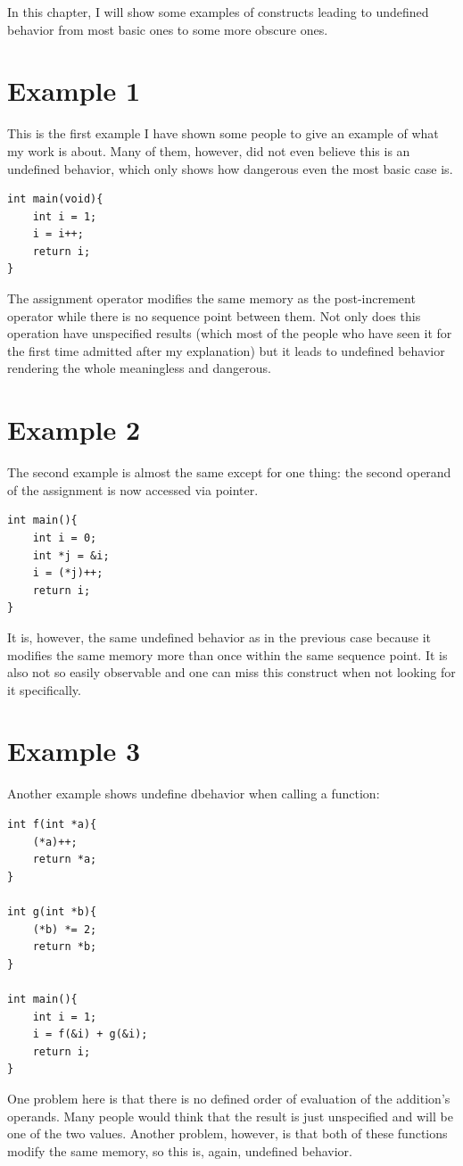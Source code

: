 In this chapter, I will show some examples of constructs leading to undefined behavior from most basic ones to some more obscure ones.

\section{Example 1}\label{example1}
This is the first example I have shown some people to give an example of what my work is about. Many of them, however, did not even believe this is an undefined behavior, which only shows how dangerous even the most basic case is.
\begin{lstlisting}
int main(void){
	int i = 1;
	i = i++;
	return i;
}
\end{lstlisting}
The assignment operator modifies the same memory as the post-increment operator while there is no sequence point between them. Not only does this operation have unspecified results (which most of the people who have seen it for the first time admitted after my explanation) but it leads to undefined behavior rendering the whole meaningless and dangerous.

\section{Example 2}\label{example2}
The second example is almost the same except for one thing: the second operand of the assignment is now accessed via pointer.
\begin{lstlisting}
int main(){
	int i = 0;
	int *j = &i;
	i = (*j)++;
    return i;
}
\end{lstlisting}\label{example2}
It is, however, the same undefined behavior as in the previous case because it modifies the same memory more than once within the same sequence point. It is also not so easily observable and one can miss this construct when not looking for it specifically.

\section{Example 3}\label{example3}
Another example shows undefine dbehavior when calling a function:
\begin{lstlisting}
int f(int *a){
    (*a)++;
    return *a;
}

int g(int *b){
    (*b) *= 2;
    return *b;
}

int main(){
    int i = 1;
    i = f(&i) + g(&i);
    return i;
}
\end{lstlisting}\label{example3}
One problem here is that there is no defined order of evaluation of the addition's operands. Many people would think that the result is just unspecified and will be one of the two values. Another problem, however, is that both of these functions modify the same memory, so this is, again, undefined behavior.

